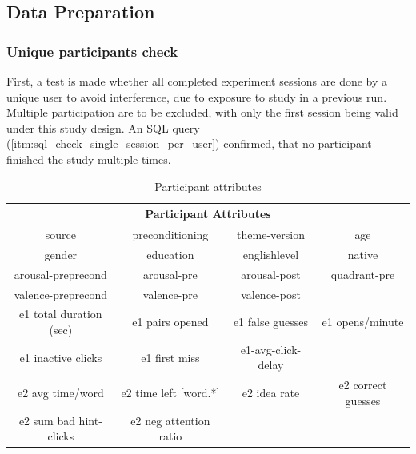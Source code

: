 	
	
	
	\subsection{Data Preparation}
	
	\subsubsection{Unique participants check} First, a test is made whether all completed experiment sessions are done by a unique user to avoid interference, due to exposure to study in a previous run. Multiple participation are to be excluded, with only the first session being valid under this study design. An SQL query (\ref{itm:sql_check_single_session_per_user}) confirmed, that no participant finished the study multiple times.
	
	\begin{table}
		\begin{center}
			\begin{tabular}{cccc}
				\hline
				\multicolumn{4}{|c|}{Participant Attributes} \\ 
				\hline 
				source & preconditioning & theme-version & age \\ 
				gender & education & englishlevel & native \\ 
				arousal-preprecond & arousal-pre & arousal-post & quadrant-pre \\ 
				valence-preprecond & valence-pre & valence-post & \\ 
				e1 total duration (sec) & e1 pairs opened & e1 false guesses & e1 opens/minute \\ 
				e1 inactive clicks & e1 first miss & e1-avg-click-delay &  \\ 
				e2 avg time/word & e2 time left [word.*]  & e2 idea rate & e2 correct guesses \\
				e2 sum bad hint-clicks & e2 neg attention ratio & & \\
				\hline
			\end{tabular} 
		\end{center}
		\caption{Participant attributes}
		\label{fig:participant_attributes}
	\end{table}

